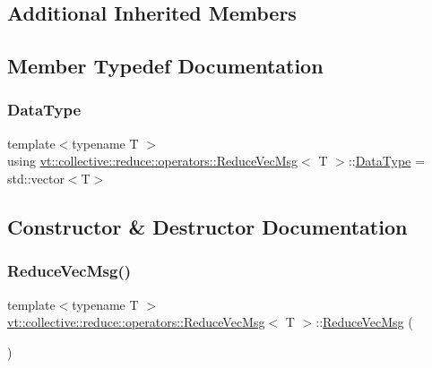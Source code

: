 \subsection*{Additional Inherited Members}


\subsection{Member Typedef Documentation}
\mbox{\label{structvt_1_1collective_1_1reduce_1_1operators_1_1_reduce_vec_msg_a556927389ef91ea8f5a7892501724a37}} 
\subsubsection{\texorpdfstring{Data\+Type}{DataType}}
{\footnotesize\ttfamily template$<$typename T $>$ \\
using \hyperlink{structvt_1_1collective_1_1reduce_1_1operators_1_1_reduce_vec_msg}{vt\+::collective\+::reduce\+::operators\+::\+Reduce\+Vec\+Msg}$<$ T $>$\+::\hyperlink{structvt_1_1collective_1_1reduce_1_1operators_1_1_reduce_vec_msg_a556927389ef91ea8f5a7892501724a37}{Data\+Type} =  std\+::vector$<$T$>$}



\subsection{Constructor \& Destructor Documentation}
\mbox{\label{structvt_1_1collective_1_1reduce_1_1operators_1_1_reduce_vec_msg_a3e167018ff1d8a0a4bf85843705b737d}} 
\subsubsection{\texorpdfstring{Reduce\+Vec\+Msg()}{ReduceVecMsg()}\hspace{0.1cm}{\footnotesize\ttfamily [1/3]}}
{\footnotesize\ttfamily template$<$typename T $>$ \\
\hyperlink{structvt_1_1collective_1_1reduce_1_1operators_1_1_reduce_vec_msg}{vt\+::collective\+::reduce\+::operators\+::\+Reduce\+Vec\+Msg}$<$ T $>$\+::\hyperlink{structvt_1_1collective_1_1reduce_1_1operators_1_1_reduce_vec_msg}{Reduce\+Vec\+Msg} (\begin{DoxyParamCaption}{ }\end{DoxyParamCaption})\hspace{0.3cm}{\ttfamily [default]}}


